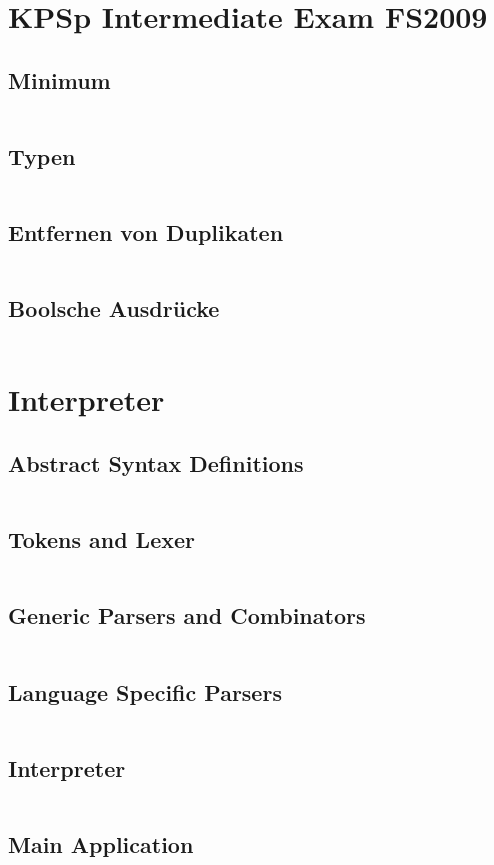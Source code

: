 \documentclass[a4paper,9pt,twoside]{book}
\newcommand{\hsfile}[1]{\inputminted[breaklines]{haskell}{../haskell/#1.hs}}
\begin{document}
\chapter{KPSp Intermediate Exam FS2009}
\section{Minimum}
\hsfile{exami2009/problem_1}
\section{Typen}
\hsfile{exami2009/problem_2}
\section{Entfernen von Duplikaten}
\hsfile{exami2009/problem_3}
\section{Boolsche Ausdrücke}
\hsfile{exami2009/problem_4}

\chapter{Interpreter}
\section{Abstract Syntax Definitions}
\hsfile{interpreter/AbsSyn}
\section{Tokens and Lexer}
\hsfile{interpreter/Scanner}
\section{Generic Parsers and Combinators}
\hsfile{interpreter/ParserCombis2}
\section{Language Specific Parsers}
\hsfile{interpreter/Parser2}
\section{Interpreter}
\hsfile{interpreter/Interpreter}
\section{Main Application}
\hsfile{interpreter/Main}
\end{document}
